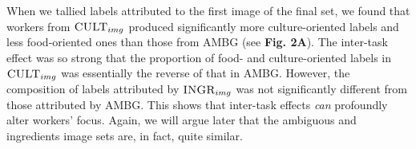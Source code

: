\documentclass[letterpaper]{article}
\begin{document}
\begin{figure}
\end{figure}
When we tallied labels attributed to the first image of the final set, 
we found that workers from $\textsc{CULT}_{img}$ produced significantly 
more culture-oriented labels and less food-oriented ones than those from
\textsc{AMBG}
(see \textbf{Fig. 2A}).  The inter-task effect was so strong that the 
proportion of food- and culture-oriented labels in $\textsc{CULT}_{img}$ was
essentially the reverse of that in \textsc{AMBG}.  However, the 
composition of labels attributed by $\textsc{INGR}_{img}$
was not significantly different from those attributed by \textsc{AMBG}.  This 
shows that inter-task effects \textit{can} profoundly alter workers' focus. 
Again, we 
will argue later that the ambiguous and ingredients image sets are, in fact, 
quite similar.
\end{document}
